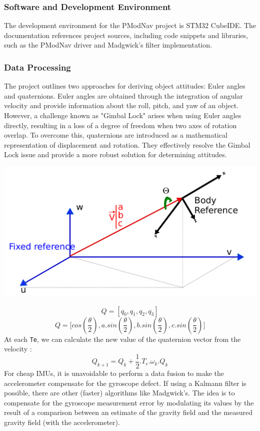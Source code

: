 \subsubsection{Software and Development Environment}
The development environment for the PModNav project is STM32 CubeIDE. The documentation references project sources, including code snippets and libraries, such as the PModNav driver and Madgwick's filter implementation. 

\subsubsection{Data Processing}
The project outlines two approaches for deriving object attitudes: Euler angles and quaternions. Euler angles are obtained through the integration of angular velocity and provide information about the roll, pitch, and yaw of an object. However, a challenge known as "Gimbal Lock" arises when using Euler angles directly, resulting in a loss of a degree of freedom when two axes of rotation overlap. To overcome this, quaternions are introduced as a mathematical representation of displacement and rotation. They effectively resolve the Gimbal Lock issue and provide a more robust solution for determining attitudes.
\begin{center}
    \includegraphics[width=0.65\linewidth]{./projects/pmodnav/quaternions.png}
\end{center}
$$ Q = [q_0, q_1, q_2, q_3 ] $$
$$ Q = \big[cos(\frac{\theta}{2}), a.sin(\frac{\theta}{2}), b.sin(\frac{\theta}{2}), c.sin(\frac{\theta}{2})\big] $$
At each \texttt{Te}, we can calculate the new value of the quaternion vector from the velocity :
$$ Q_{k+1} = Q_k+\frac{1}{2}.T_e.\omega_k.Q_k $$
For cheap IMUs, it is unavoidable to perform a data fusion to make the accelerometer compensate for the gyroscope defect. If using a Kalmann filter is possible, there are other (faster) algorithms like Madgwick's. The idea is to compensate for the gyroscope measurement error by modulating its values by the result of a comparison between an estimate of the gravity field and the measured gravity field (with the accelerometer).
